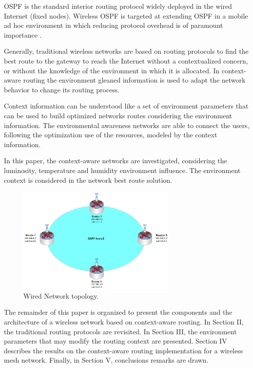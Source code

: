 OSPF is the standard interior routing protocol widely deployed in the wired Internet (fixed nodes). Wireless OSPF is targeted at extending OSPF in a mobile ad hoc environment in which reducing protocol overhead is of paramount importance \cite{Holter2010}.

Generally, traditional wireless networks are based on routing protocols to find the best route to the gateway to reach the Internet without a contextualized concern, or without the knowledge of the environment in which it is allocated. In context-aware routing the environment gleaned information is used to adapt the network behavior to change its routing process.

Context information can be understood like a set of environment parameters that can be used to build optimized networks routes considering the environment information. The environmental awareness networks are able to connect the users, following the optimization use of the resources, modeled by the context information.

In this paper, the context-aware networks are investigated, considering the luminosity, temperature and humidity environment influence. The environment context is considered in the network best route solution.

\begin{figure}[!t]
	\centering
	\includegraphics[width=0.7\textwidth]{figs/topology.eps}
	\caption{Wired Network topology.}
	\label{Fig01}
\end{figure}

The remainder of this paper is organized to present the components and the architecture of a wireless network based on context-aware routing. In Section II, the traditional routing protocols are revisited. In Section III, the environment parameters that may modify the routing context are presented. Section IV describes the results on the context-aware routing implementation for a wireless mesh network. Finally, in Section V, conclusions remarks are drawn.